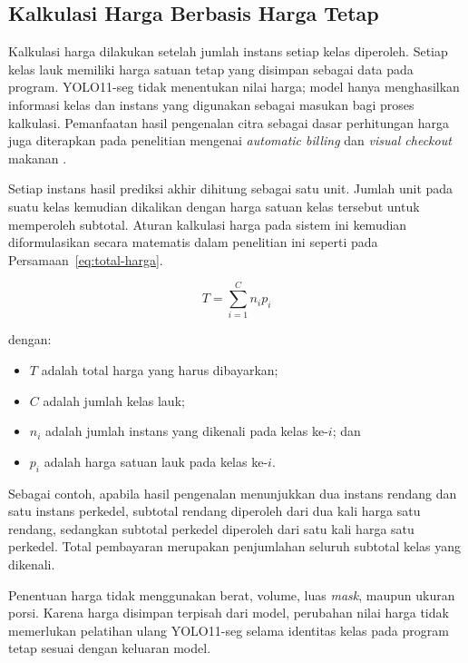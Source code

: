 \subsection{Kalkulasi Harga Berbasis Harga Tetap}

Kalkulasi harga dilakukan setelah jumlah instans setiap kelas diperoleh. Setiap kelas lauk memiliki harga satuan tetap yang disimpan sebagai data pada program. YOLO11-seg tidak menentukan nilai harga; model hanya menghasilkan informasi kelas dan instans yang digunakan sebagai masukan bagi proses kalkulasi. Pemanfaatan hasil pengenalan citra sebagai dasar perhitungan harga juga diterapkan pada penelitian mengenai \textit{automatic billing} dan \textit{visual checkout} makanan \cite{wu2021,guo2023}.

Setiap instans hasil prediksi akhir dihitung sebagai satu unit. Jumlah unit pada suatu kelas kemudian dikalikan dengan harga satuan kelas tersebut untuk memperoleh subtotal. Aturan kalkulasi harga pada sistem ini kemudian diformulasikan secara matematis dalam penelitian ini seperti pada Persamaan~\ref{eq:total-harga}.

\begin{equation}
    T = \sum_{i=1}^{C} n_i p_i
    \label{eq:total-harga}
\end{equation}

dengan:
\begin{itemize}
    \item $T$ adalah total harga yang harus dibayarkan;
    \item $C$ adalah jumlah kelas lauk;
    \item $n_i$ adalah jumlah instans yang dikenali pada kelas ke-$i$; dan
    \item $p_i$ adalah harga satuan lauk pada kelas ke-$i$.
\end{itemize}

Sebagai contoh, apabila hasil pengenalan menunjukkan dua instans rendang dan satu instans perkedel, subtotal rendang diperoleh dari dua kali harga satu rendang, sedangkan subtotal perkedel diperoleh dari satu kali harga satu perkedel. Total pembayaran merupakan penjumlahan seluruh subtotal kelas yang dikenali.

Penentuan harga tidak menggunakan berat, volume, luas \textit{mask}, maupun ukuran porsi. Karena harga disimpan terpisah dari model, perubahan nilai harga tidak memerlukan pelatihan ulang YOLO11-seg selama identitas kelas pada program tetap sesuai dengan keluaran model.
